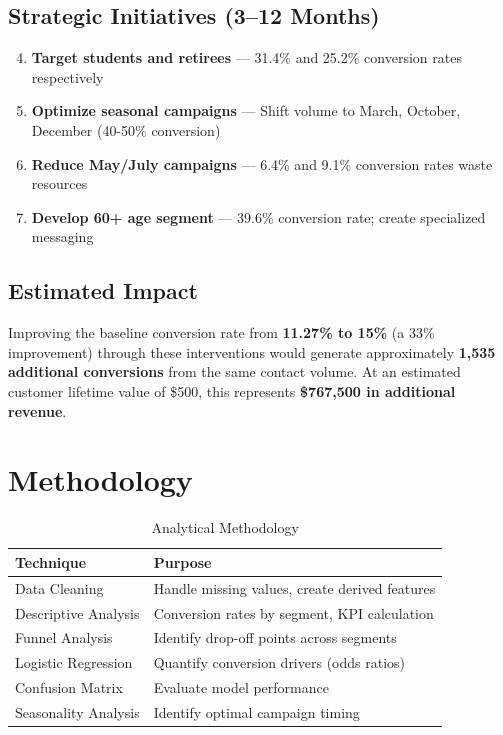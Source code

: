 \documentclass[11pt,a4paper]{article}
\begin{document}
\subsection{Strategic Initiatives (3--12 Months)}

\begin{enumerate}[label=\color{accent}\textbf{\theenumi.}, leftmargin=*]
    \setcounter{enumi}{3}
    \item \textbf{Target students and retirees} — 31.4\% and 25.2\% conversion rates respectively
    \item \textbf{Optimize seasonal campaigns} — Shift volume to March, October, December (40-50\% conversion)
    \item \textbf{Reduce May/July campaigns} — 6.4\% and 9.1\% conversion rates waste resources
    \item \textbf{Develop 60+ age segment} — 39.6\% conversion rate; create specialized messaging
\end{enumerate}

\subsection{Estimated Impact}

\begin{tcolorbox}[
    colback=conversiongreen!5,
    colframe=conversiongreen!50,
    arc=8pt,
    left=15pt,
    right=15pt
]
Improving the baseline conversion rate from \textbf{11.27\% to 15\%} (a 33\% improvement) through these interventions would generate approximately \textbf{1,535 additional conversions} from the same contact volume. At an estimated customer lifetime value of \$500, this represents \textbf{\$767,500 in additional revenue}.
\end{tcolorbox}

\section{Methodology}

\begin{table}[H]
\centering
\begin{tabular}{p{4cm} p{7cm}}
\toprule
\rowcolor{primary!10}
\textbf{Technique} & \textbf{Purpose} \\
\midrule
Data Cleaning & Handle missing values, create derived features \\
Descriptive Analysis & Conversion rates by segment, KPI calculation \\
Funnel Analysis & Identify drop-off points across segments \\
Logistic Regression & Quantify conversion drivers (odds ratios) \\
Confusion Matrix & Evaluate model performance \\
Seasonality Analysis & Identify optimal campaign timing \\
\bottomrule
\end{tabular}
\caption{Analytical Methodology}
\end{table}
\end{document}
